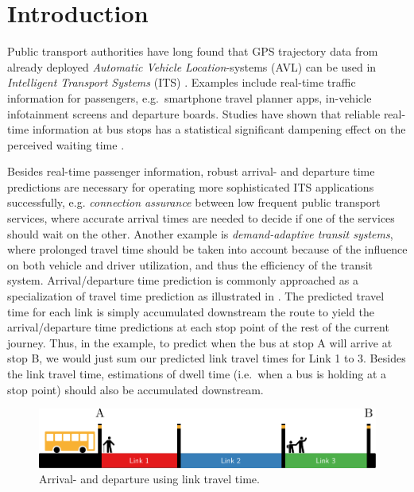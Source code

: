﻿\documentclass[preprint,11pt,5p,twocolumn]{elsarticle}
\begin{document}
\section{Introduction}
Public transport authorities have long found that GPS trajectory data from already deployed \emph{Automatic Vehicle Location}-systems (AVL) can be used in \emph{Intelligent Transport Systems} (ITS) \cite{Tcrp48}. Examples include real-time traffic information for passengers, e.g.\ smartphone travel planner apps, in-vehicle infotainment screens and departure boards. Studies have shown that reliable real-time information at bus stops has a statistical significant dampening effect on the perceived waiting time \cite{Fan2016}.

Besides real-time passenger information, robust arrival- and departure time predictions are necessary for operating more sophisticated ITS applications successfully, e.g. \emph{connection assurance} between low frequent public transport services, where accurate arrival times are needed to decide if one of the services should wait on the other. Another example is \emph{demand-adaptive transit systems}, where prolonged travel time should be taken into account because of the influence on both vehicle and driver utilization, and thus the efficiency of the transit system. Arrival/departure time prediction is commonly approached as a specialization of travel time prediction as illustrated in . The predicted travel time for each link is simply accumulated downstream the route to yield the arrival/departure time predictions at each stop point of the rest of the current journey. Thus, in the example, to predict when the bus at stop A will arrive at stop B, we would just sum our predicted link travel times for Link 1 to 3. Besides the link travel time, estimations of dwell time (i.e.\ when a bus is holding at a stop point) should also be accumulated downstream.

\begin{figure}[!ht]
  \center  
  \includegraphics[width=\columnwidth]{drawings/bus-arrival-links-narrow.pdf}
  \caption{Arrival- and departure using link travel time.}
  \label{fig:bus-arrival-links}
\end{figure}
\end{document}
